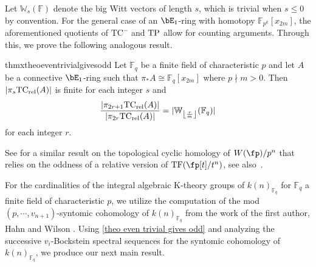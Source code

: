 \documentclass[english,10pt]{amsart}
\newcommand{\rel}{\textup{rel}}
\newcommand{\field}{\mathbb{F}}
\theoremstyle{definition}
\numberwithin{equation}{section}
\newcommand{\ntc}{\mathrm{TC}^{-}}
\DeclareMathOperator{\tp}{\ensuremath{\textup{TP}}}
\newcommand{\rtc}{\mathrm{TC}_{\rel}}
\newcommand{\pis}{\pi_*}
\DeclarePairedDelimiter\floor{\lfloor}{\rfloor}
\begin{document}
Let $\mathbb{W}_{s}(\field)$ denote the big Witt vectors of length $s$, which is trivial when $s\le 0$ by convention. For the general case of an $\bE_1$-ring with homotopy $\mathbb{F}_{p^k}[x_{2m}]$, the aforementioned quotients of $\ntc$ and $\tp$ allow for counting arguments. Through this, we prove the following analogous result. 



\begin{restatable}{thmx}{theoeventrivialgivesodd}
\label{theo even trivial gives odd}
Let $\field_q$ be a finite field of characteristic $p$ and let $A$ be a connective $\bE_1$-ring such that $\pis A \cong \field_q[x_{2m}]$ where $p\nmid m>0$. Then $\lvert \pi_s \rtc(A)\rvert$ is finite for each integer $s$ and 
\[\frac{\lvert \pi_{2r+1}\rtc(A)\rvert}{\lvert \pi_{2r} \rtc(A)\rvert} = \lvert \mathbb{W}_{\floor*{\frac{r}{m}}}(\field_q) \rvert \]
for each integer $r$. 
\end{restatable}

See \cite[Theorem B]{Angeltveit2015kTheoryfinitewitt} for a similar result on the topological cyclic homology of $W(\fp)/p^n$ that relies on the oddness of  a relative version of $\textup{TF}(\fp[t]/t^n)$, see also~\cite[Proposition~1.5]{AKN24}. 

 For the cardinalities of the integral algebraic K-theory groups of $k(n)_{\field_q}$ for $\field_q$ a finite field of characteristic $p$, we utilize the computation of the mod $(p,\cdots,v_{n+1})$-syntomic cohomology of $k(n)_{\field_q}$ from the work of the first author, Hahn and Wilson \cite{angelini2024syntomic}. Using \autoref{theo even trivial gives odd} and analyzing the successive $v_i$-Bockstein spectral sequences for the syntomic cohomology of $k(n)_{\field_q}$, we produce our next main result. 
\end{document}
